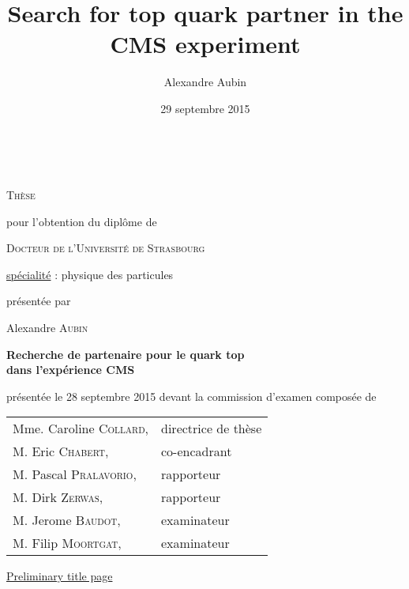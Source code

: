 


\title{Search for top quark partner in the CMS experiment}
\author{Alexandre Aubin}
\date{29 septembre 2015}

\begin{titlepage}
    \vspace*{1cm}
    \begin{center}
        \\

        \vspace*{0.8cm}

        {\Large \textsc{Thèse}}

        \vspace*{0.8cm}

        pour l'obtention du diplôme de

        \vspace*{0.8cm}

        {\Large \textsc{Docteur de l'Université de Strasbourg}}

        \vspace*{0.8cm}

        \underline{spécialité} : physique des particules

        \vspace*{0.8cm}

        présentée par

        Alexandre \textsc{Aubin}

        \vspace*{0.8cm}

        {\Large \textbf{Recherche de partenaire pour le quark top\\ dans l'expérience CMS}}

        \vspace*{0.8cm}

        présentée le 28 septembre 2015 devant la commission d'examen composée de

        \vspace*{0.8cm}

        \begin{tabular}{ll}
            Mme. Caroline \textsc{Collard}, & directrice de thèse\\
            M. Eric \textsc{Chabert},       & co-encadrant\\
            M. Pascal \textsc{Pralavorio},  & rapporteur\\
            M. Dirk \textsc{Zerwas},        & rapporteur\\
            M. Jerome \textsc{Baudot},      & examinateur\\
            M. Filip \textsc{Moortgat},     & examinateur\\
        \end{tabular}

        \vspace*{0.5cm}

        \underline{\Huge{Preliminary title page}}

    \end{center}
    \vspace*{1cm}
\end{titlepage}
\restoregeometry
